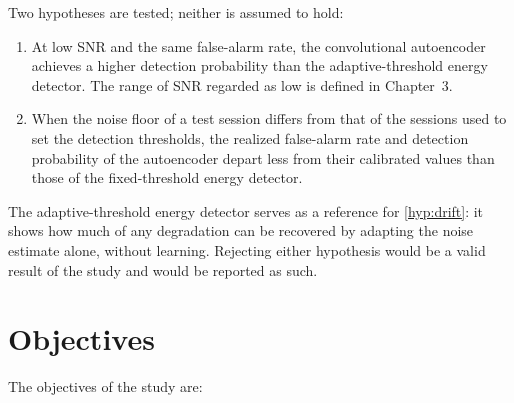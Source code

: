 Two hypotheses are tested; neither is assumed to hold:

\begin{enumerate}[label=\textbf{H\arabic*.}, ref=H\arabic*, leftmargin=*]
  \item\label{hyp:low-snr} At low SNR and the same false-alarm rate, the convolutional autoencoder achieves a higher detection probability than the adaptive-threshold energy detector. The range of SNR regarded as low is defined in Chapter~3.
  \item\label{hyp:drift} When the noise floor of a test session differs from that of the sessions used to set the detection thresholds, the realized false-alarm rate and detection probability of the autoencoder depart less from their calibrated values than those of the fixed-threshold energy detector.
\end{enumerate}

The adaptive-threshold energy detector serves as a reference for \ref{hyp:drift}: it shows how much of any degradation can be recovered by adapting the noise estimate alone, without learning. Rejecting either hypothesis would be a valid result of the study and would be reported as such.

\section{Objectives}
\label{sec:objectives}

The objectives of the study are:

